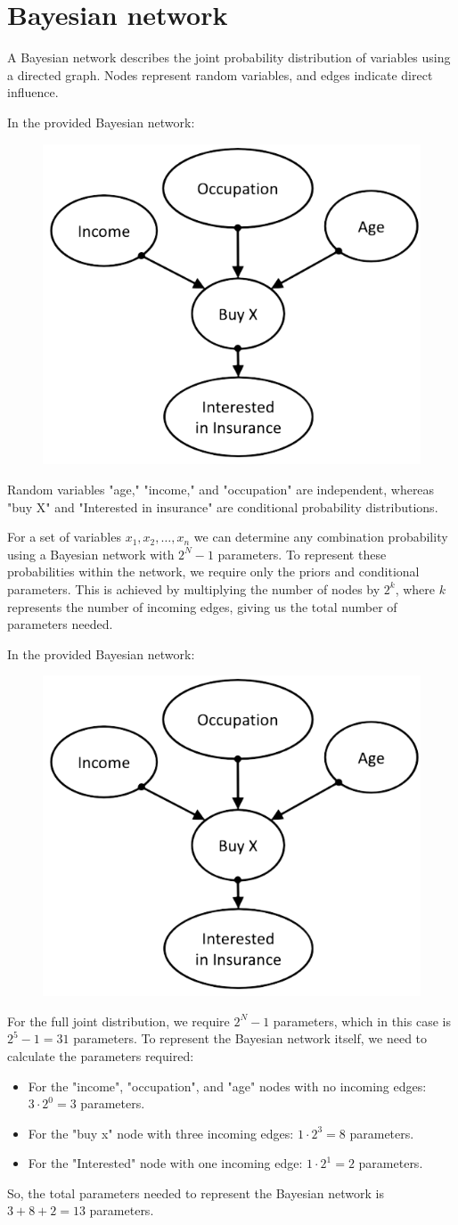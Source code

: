 \section{Bayesian network}

A Bayesian network describes the joint probability distribution of variables using a directed graph. 
Nodes represent random variables, and edges indicate direct influence.
\begin{example}
    In the provided Bayesian network:
    \begin{figure}[H]
        \centering
        \includegraphics[width=0.25\linewidth]{images/insurance.png}
    \end{figure}
    Random variables "age," "income," and "occupation" are independent, whereas "buy X" and "Interested in insurance" are conditional probability distributions.
\end{example}
For a set of variables $x_1, x_2, \ldots, x_n$ we can determine any combination probability using a Bayesian network with $2^N - 1$ parameters. 
To represent these probabilities within the network, we require only the priors and conditional parameters. 
This is achieved by multiplying the number of nodes by $2^k$, where $k$ represents the number of incoming edges, giving us the total number of parameters needed.
\begin{example}
    In the provided Bayesian network:
    \begin{figure}[H]
        \centering
        \includegraphics[width=0.25\linewidth]{images/insurance.png}
    \end{figure}
    For the full joint distribution, we require $2^N - 1$ parameters, which in this case is $2^5 - 1 = 31$ parameters.
    To represent the Bayesian network itself, we need to calculate the parameters required:
    \begin{itemize}
        \item For the "income", "occupation", and "age" nodes with no incoming edges: $3 \cdot 2^0 = 3$ parameters.
        \item For the "buy x" node with three incoming edges: $1 \cdot 2^3 = 8$ parameters.
        \item For the "Interested" node with one incoming edge: $1 \cdot 2^1 = 2$ parameters.
    \end{itemize}
    So, the total parameters needed to represent the Bayesian network is $3 + 8 + 2 = 13$ parameters.
\end{example}
